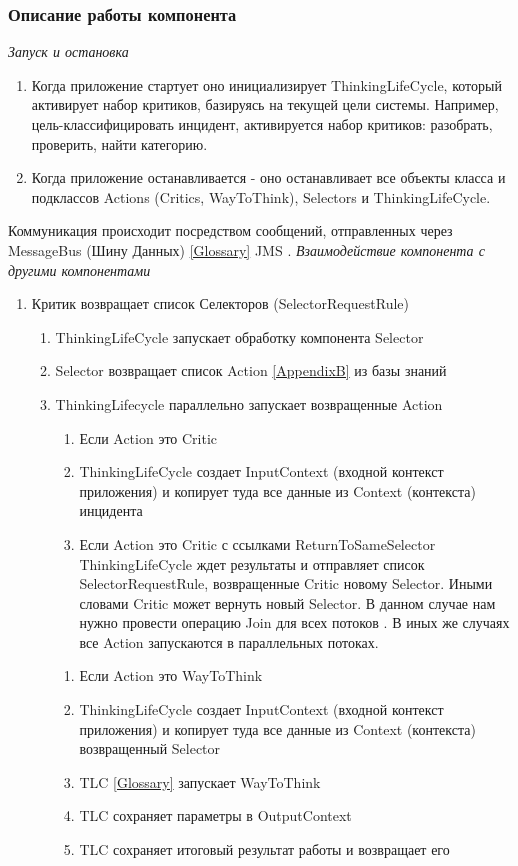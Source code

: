 \subsubsection{Описание работы компонента}
\emph{Запуск и остановка} 
\begin{enumerate}
	\item Когда приложение стартует оно инициализирует ThinkingLifeCycle, который активирует набор критиков, базируясь на текущей цели системы. Например, цель-классифицировать инцидент, активируется набор критиков: разобрать, проверить, найти категорию.
	\item Когда приложение останавливается - оно останавливает все объекты класса и подклассов Actions (Critics, WayToThink), Selectors и ThinkingLifeCycle.
\end{enumerate}
Коммуникация происходит посредством сообщений, отправленных через MessageBus (Шину Данных) \ref{Glossary} JMS \cite{JMS}.
\emph{Взаимодействие компонента с другими компонентами} \\
\begin{enumerate}
	\item Критик возвращает список Селекторов (SelectorRequestRule)
	\begin{enumerate}
	\item ThinkingLifeCycle запускает обработку компонента Selector
	\item Selector возвращает список Action \ref{AppendixB} из базы знаний
	\item ThinkingLifecycle параллельно запускает возвращенные Action
	\begin{enumerate}
	\item Если Action это Critic
	\item ThinkingLifeCycle создает InputContext (входной контекст приложения) и копирует туда все данные из Context (контекста) инцидента
	\item Если Action это Critic с ссылками ReturnToSameSelector ThinkingLifeCycle ждет результаты и отправляет список SelectorRequestRule, возвращенные Critic новому Selector. Иными словами Critic может вернуть новый Selector. В данном случае нам нужно провести операцию Join для всех потоков \cite{JavaConcurrency}. В иных же случаях все Action запускаются в параллельных потоках.
	\end{enumerate} 
	\begin{enumerate}
	\item Если Action это WayToThink
	\item ThinkingLifeCycle создает InputContext (входной контекст приложения) и копирует туда все данные из Context (контекста) возвращенный Selector
	\item TLC \ref{Glossary} запускает WayToThink
	\item TLC сохраняет параметры в OutputContext
	\item TLC сохраняет итоговый результат работы и возвращает его 
	\end{enumerate} 
	\end{enumerate}
\end{enumerate}
\clearpage
